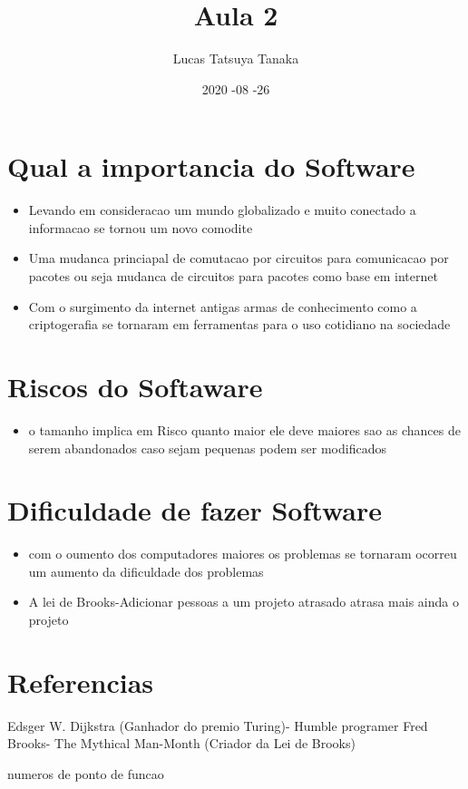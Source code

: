 \documentclass{article} %
\title{Aula 2} %
\date{2020 -08 -26}
\author{Lucas Tatsuya Tanaka}
\begin{document}
  \maketitle

    \section{Qual a importancia do Software}
    \begin{itemize}
	\item Levando em consideracao um mundo globalizado e muito conectado 
            a informacao se tornou um novo comodite
	\item Uma mudanca princiapal de comutacao por circuitos para comunicacao por pacotes 
            ou seja mudanca de circuitos para pacotes como base em internet 
	\item Com o surgimento da internet antigas armas de conhecimento como a criptogerafia
            se tornaram em ferramentas para o uso cotidiano na sociedade 
    \end{itemize}

    \section{Riscos do Softaware}
    \begin{itemize}
        \item o tamanho implica em Risco quanto maior ele deve maiores sao as chances de 
            serem abandonados caso sejam pequenas podem ser modificados
    \end{itemize}

    \section{Dificuldade de fazer Software}
    \begin{itemize}
        \item com o oumento dos computadores maiores os problemas se tornaram ocorreu um 
            aumento da dificuldade dos problemas
        \item A lei de Brooks-Adicionar pessoas a um projeto atrasado atrasa mais ainda o 
            projeto
    \end{itemize}

    \section{Referencias}
    Edsger W. Dijkstra (Ganhador do premio Turing)- Humble programer 
    Fred Brooks- The Mythical Man-Month (Criador da Lei de Brooks)

numeros de ponto de funcao
\end{document}
